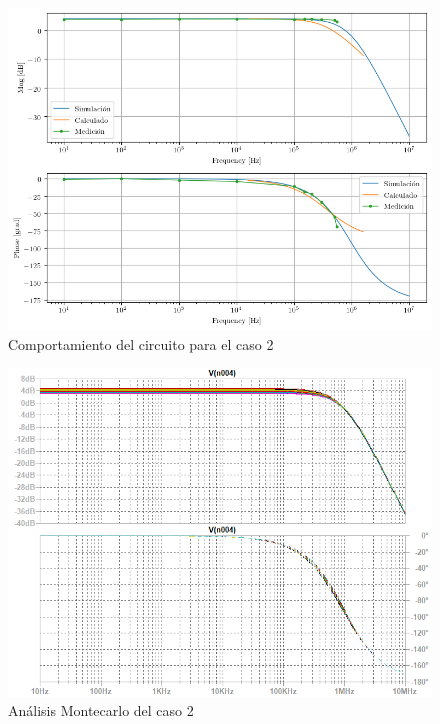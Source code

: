 \begin{figure}[H]
\begin{centering}
\includegraphics[scale=0.5]{../Ex1/ib/Resources1b/H2b}
\par\end{centering}
\caption{Comportamiento del circuito para el caso 2}
\end{figure}

\begin{figure}[H]
\begin{centering}
\includegraphics[scale=0.5]{../Ex1/ib/Resources1b/Montecarlo2}
\par\end{centering}
\caption{Análisis Montecarlo del caso 2}
\end{figure}


